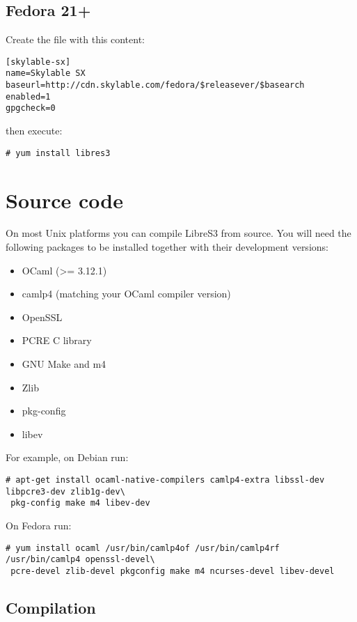 \subsection{Fedora 21+}
Create the file  with this content:
\begin{lstlisting}
[skylable-sx]
name=Skylable SX
baseurl=http://cdn.skylable.com/fedora/$releasever/$basearch
enabled=1
gpgcheck=0
\end{lstlisting}
then execute:
\begin{lstlisting}
# yum install libres3
\end{lstlisting}

\section{Source code}

On most Unix platforms you can compile LibreS3
from source. You will need the following packages to be installed together with their
development versions:
\begin{itemize}
    \item OCaml (>= 3.12.1)
    \item camlp4 (matching your OCaml compiler version)
    \item OpenSSL
    \item PCRE C library
    \item GNU Make and m4
    \item Zlib
    \item pkg-config
    \item libev
\end{itemize}
For example, on Debian run:

\begin{lstlisting}
# apt-get install ocaml-native-compilers camlp4-extra libssl-dev libpcre3-dev zlib1g-dev\
 pkg-config make m4 libev-dev
\end{lstlisting}

On Fedora run:

\begin{lstlisting}
# yum install ocaml /usr/bin/camlp4of /usr/bin/camlp4rf /usr/bin/camlp4 openssl-devel\
 pcre-devel zlib-devel pkgconfig make m4 ncurses-devel libev-devel
\end{lstlisting}


\subsection{Compilation}

